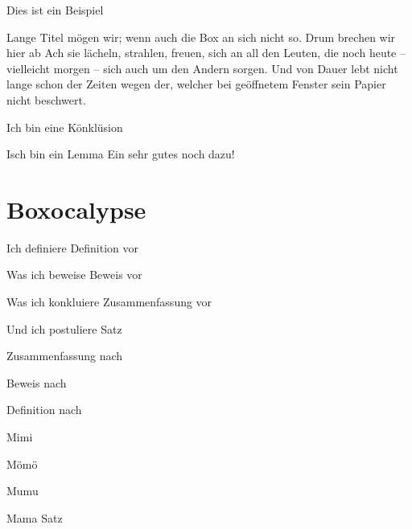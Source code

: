 \documentclass[twocolumn]{article}
\begin{document}
    \blindtext

    \begin{beispiel*}{Dies ist ein Beispiel}
        \blindtext
    \end{beispiel*}

    \blindtext

    \begin{definition*}{Lange Titel mögen wir; wenn auch die Box an sich nicht so. Drum brechen wir hier ab}
        \label{def:exdef}Ach sie lächeln, strahlen, freuen, sich an all den Leuten,
        die noch heute -- vielleicht morgen -- sich auch um den Andern sorgen. Und von Dauer lebt nicht lange schon der Zeiten wegen
        der, welcher bei geöffnetem Fenster sein Papier nicht beschwert.
    \end{definition*}

    \blindtext

    \begin{zusammenfassung}{Ich bin eine Könklüsion}
        \blindtext
    \end{zusammenfassung}

    \blindtext[1]

    \begin{lemma}{Isch bin ein Lemma}
        Ein sehr gutes noch dazu!
    \end{lemma}

    \blindtext[2]

    \listofdefinitions
    \listofremarks
    \listoftheorems
    \listofexamples
    \listoflemmas
    \listofsummaries
    \listofproofs

    \section{Boxocalypse}

    \begin{definition}{Ich definiere}
        Definition vor\\
        \begin{beweis}{Was ich beweise}
            Beweis vor\\
            \begin{zusammenfassung}{Was ich konkluiere}
                Zusammenfassung vor\\
                \begin{satz}{Und ich postuliere}
                    Satz
                \end{satz}
                Zusammenfassung nach
            \end{zusammenfassung}
            Beweis nach
        \end{beweis}
        Definition nach
    \end{definition}


    \begin{definition}{Mimi}
        \begin{beweis}{Mömö}
            \begin{zusammenfassung}{Mumu}
                \begin{satz}{Mama}
                    Satz
                \end{satz}
            \end{zusammenfassung}
        \end{beweis}
    \end{definition}
\end{document}
